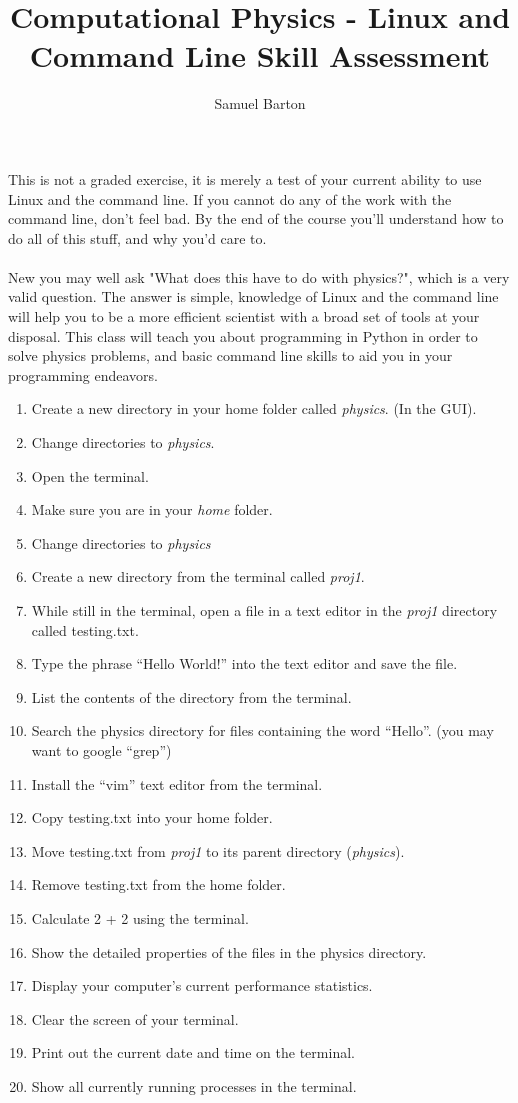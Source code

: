 \documentclass{article}
\title{Computational Physics - Linux and Command Line Skill Assessment}
\author {Samuel Barton}
\begin{document}
	
	\maketitle
	
	This is not a graded exercise, it is merely a test of your current ability to use Linux and the command line. If you cannot do any of the work with the command line, don't feel bad. By the end of the course you'll understand how to do all of this stuff, and why you'd care to.
\\
\\
	New you may well ask "What does this have to do with physics?", which is a very valid question. The answer is simple, knowledge of Linux and the command line will help you to be a more efficient scientist with a broad set of tools at your disposal. This class will teach you about programming in Python in order to solve physics problems, and basic command line skills to aid you in your programming endeavors.
	
	\newpage
	
	\begin{enumerate}
		\item Create a new directory in your home folder called \textit{physics}. (In the GUI).
		\item Change directories to \textit{physics}. 
		\item Open the terminal. 
		\item Make sure you are in your \textit{home} folder.
		\item Change directories to \textit{physics}
		\item Create a new directory from the terminal called \textit{proj1}.
		\item While still in the terminal, open a file in a text editor in the \textit{proj1} directory called \textsf{testing.txt}.
		\item Type the phrase ``Hello World!'' into the text editor and save the file.
		\item List the contents of the directory from the terminal.
		\item Search the physics directory for files containing the word ``Hello''. (you may want to google ``grep'')
		\item Install the ``vim'' text editor from the terminal.
		\item Copy \textsf{testing.txt} into your home folder.
		\item Move \textsf{testing.txt} from \textit{proj1} to its parent directory (\textit{physics}).
		\item Remove \textsf{testing.txt} from the home folder.
		\item Calculate 2 + 2 using the terminal.
		\item Show the detailed properties of the files in the physics directory.
		\item Display your computer's current performance statistics.
		\item Clear the screen of your terminal.
		\item Print out the current date and time on the terminal.
		\item Show all currently running processes in the terminal.
	\end{enumerate}
\end{document}
